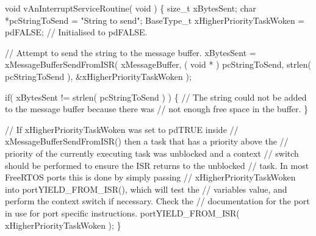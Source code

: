 \begin{DoxyPre}
\begin{DoxyPre}
\begin{DoxyPre}void vAnInterruptServiceRoutine( void )
\{
size\_t xBytesSent;
char *pcStringToSend = "String to send";
BaseType\_t xHigherPriorityTaskWoken = pdFALSE; // Initialised to pdFALSE.\end{DoxyPre}
\end{DoxyPre}
\end{DoxyPre}



\begin{DoxyPre}
\begin{DoxyPre}
\begin{DoxyPre}    // Attempt to send the string to the message buffer.
    xBytesSent = xMessageBufferSendFromISR( xMessageBuffer,
                                            ( void * ) pcStringToSend,
                                            strlen( pcStringToSend ),
                                            \&xHigherPriorityTaskWoken );\end{DoxyPre}
\end{DoxyPre}
\end{DoxyPre}



\begin{DoxyPre}
\begin{DoxyPre}
\begin{DoxyPre}    if( xBytesSent != strlen( pcStringToSend ) )
    \{
        // The string could not be added to the message buffer because there was
        // not enough free space in the buffer.
    \}\end{DoxyPre}
\end{DoxyPre}
\end{DoxyPre}



\begin{DoxyPre}
\begin{DoxyPre}
\begin{DoxyPre}    // If xHigherPriorityTaskWoken was set to pdTRUE inside
    // xMessageBufferSendFromISR() then a task that has a priority above the
    // priority of the currently executing task was unblocked and a context
    // switch should be performed to ensure the ISR returns to the unblocked
    // task.  In most FreeRTOS ports this is done by simply passing
    // xHigherPriorityTaskWoken into portYIELD\_FROM\_ISR(), which will test the
    // variables value, and perform the context switch if necessary.  Check the
    // documentation for the port in use for port specific instructions.
    portYIELD\_FROM\_ISR( xHigherPriorityTaskWoken );
\}
\end{DoxyPre}
 \end{DoxyPre}
\end{DoxyPre}
